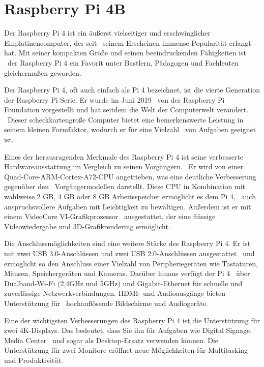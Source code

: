 \section{Raspberry Pi 4B}\label{sec:RaspberryPi4B}
Der Raspberry Pi 4 ist ein äußerst vielseitiger und erschwinglicher Einplatinencomputer, der seit \
seinem Erscheinen immense Popularität erlangt hat. Mit seiner kompakten Größe und seinen beeindruckenden Fähigkeiten ist \ 
der Raspberry Pi 4 ein Favorit unter Bastlern, Pädagogen und Fachleuten gleichermaßen geworden.

Der Raspberry Pi 4, oft auch einfach als Pi 4 bezeichnet, ist die vierte Generation der Raspberry Pi-Serie. Er wurde im Juni 2019 \ 
von der Raspberry Pi Foundation vorgestellt und hat seitdem die Welt der Computerwelt verändert. \ 
Dieser scheckkartengroße Computer bietet eine bemerkenswerte Leistung in seinem kleinen Formfaktor, wodurch er für eine Vielzahl \ 
von Aufgaben geeignet ist.

Eines der herausragenden Merkmale des Raspberry Pi 4 ist seine verbesserte Hardwareausstattung im Vergleich zu seinen Vorgängern. \ 
Er wird von einer Quad-Core-ARM-Cortex-A72-CPU angetrieben, was eine deutliche Verbesserung gegenüber den \ 
Vorgängermodellen darstellt. Diese CPU in Kombination mit wahlweise 2 GB, 4 GB oder 8 GB Arbeitsspeicher ermöglicht es dem Pi 4, \ 
auch anspruchsvollere Aufgaben mit Leichtigkeit zu bewältigen. Außerdem ist er mit einem VideoCore VI-Grafikprozessor \ 
ausgestattet, der eine flüssige Videowiedergabe und 3D-Grafikrendering ermöglicht.

Die Anschlussmöglichkeiten sind eine weitere Stärke des Raspberry Pi 4. Er ist mit zwei USB 3.0-Anschlüssen und zwei USB 2.0-Anschlüssen ausgestattet \
und ermöglicht so den Anschluss einer Vielzahl von Peripheriegeräten wie Tastaturen, Mäusen, Speichergeräten und Kameras. Darüber hinaus verfügt der Pi 4 \ 
über Dualband-Wi-Fi (2,4GHz und 5GHz) und Gigabit-Ethernet für schnelle und zuverlässige Netzwerkverbindungen. HDMI- und Audioausgänge bieten Unterstützung für \ 
hochauflösende Bildschirme und Audiogeräte.

Eine der wichtigsten Verbesserungen des Raspberry Pi 4 ist die Unterstützung für zwei 4K-Displays. Das bedeutet, dass Sie ihn für Aufgaben wie Digital Signage, Media Center \ 
und sogar als Desktop-Ersatz verwenden können. Die Unterstützung für zwei Monitore eröffnet neue Möglichkeiten für Multitasking und Produktivität.


